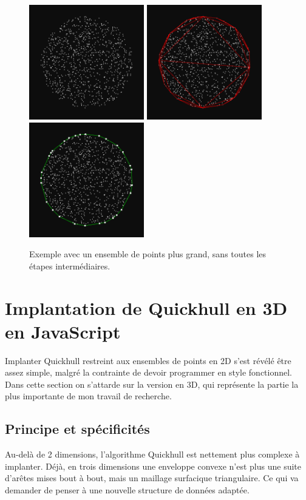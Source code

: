 \documentclass[]{article}
\begin{document}
\begin{figure}[H]
	\begin{center}
		\includegraphics[width=5cm]{qh2d/demo2d/frame_b0.png}
		\includegraphics[width=5cm]{qh2d/demo2d/frame_b1.png}
		\includegraphics[width=5cm]{qh2d/demo2d/frame_b2.png}
	\end{center}
	\caption{Exemple avec un ensemble de points plus grand, sans toutes les étapes intermédiaires.}
\end{figure}

\section{Implantation de Quickhull en 3D en JavaScript}
Implanter Quickhull restreint aux ensembles de points en 2D s'est révélé être assez simple, malgré la contrainte de devoir programmer en style fonctionnel. Dans cette section on s'attarde sur la version en 3D, qui représente la partie la plus importante de mon travail de recherche.

\subsection{Principe et spécificités}
Au-delà de 2 dimensions, l'algorithme Quickhull est nettement plus complexe à implanter. Déjà, en trois dimensions une enveloppe convexe n'est plus une suite d'arêtes mises bout à bout, mais un maillage surfacique triangulaire. Ce qui va demander de penser à une nouvelle structure de données adaptée.
\end{document}
